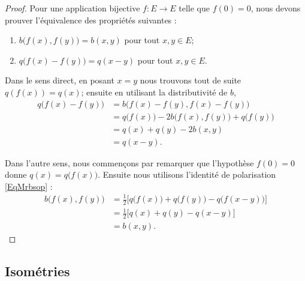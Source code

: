\begin{proof}
    Pour une application bijective \( f\colon E\to E\) telle que \( f(0)=0\), nous devons prouver l'équivalence des propriétés suivantes :
    \begin{enumerate}
        \item
            \( b\big( f(x),f(y) \big)=b(x,y)\) pour tout \( x,y\in E\);
        \item
            \( q\big( f(x)-f(y) \big)=q(x-y)\) pour tout \( x,y\in E\).
    \end{enumerate}

    Dans le sens direct, en posant \( x=y\) nous trouvons tout de suite \( q(f(x))=q(x)\); ensuite en utilisant la distributivité de \( b\),
    \begin{subequations}
        \begin{align}
            q\big( f(x)-f(y) \big)&=b\big( f(x)-f(y),f(x)-f(y) \big)\\
            &=q\big( f(x) \big)-2b\big( f(x),f(y) \big)+q\big( f(y) \big)\\
            &=q(x)+q(y)-2b(x,y)\\
            &=q(x-y).
        \end{align}
    \end{subequations}

    Dans l'autre sens, nous commençons par remarquer que l'hypothèse \( f(0)=0\) donne \( q(x)=q\big( f(x) \big)\). Ensuite nous utilisons l'identité de polarisation \eqref{EqMrbsop} :
    \begin{subequations}
        \begin{align}
            b\big( f(x),f(y) \big)&=\frac{ 1 }{2}\big[ q\big( f(x) \big)+q\big( f(y) \big)-q\big( f(x-y) \big) \big]\\
            &=\frac{ 1 }{2}\big[ q(x)+q(y)-q(x-y) \big]\\
            &=b(x,y).
        \end{align}
    \end{subequations}
\end{proof}

\subsection{Isométries}

